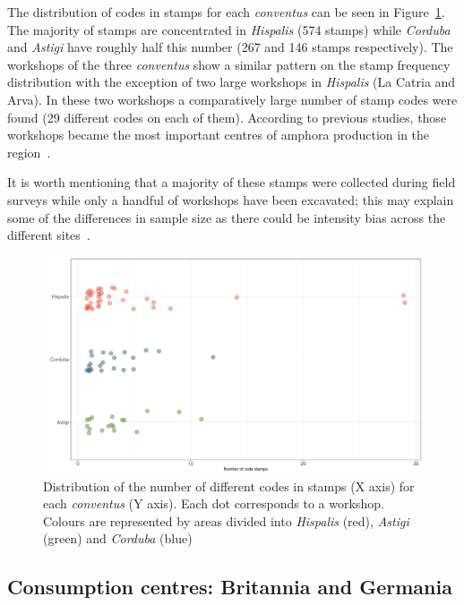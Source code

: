 The distribution of codes in stamps for each \textit{conventus} can be seen in Figure~\ref{frequency}. The majority of stamps are concentrated in \textit{Hispalis} (574 stamps) while \textit{Corduba} and \textit{Astigi} have roughly half this number (267 and 146 stamps respectively). The workshops of the three \textit{conventus} show a similar pattern on the stamp frequency distribution with the exception of two large workshops in \textit{Hispalis} (La Catria and Arva). In these two workshops a comparatively large number of stamp codes were found (29 different codes on each of them). According to previous studies, those workshops became the most important centres of amphora production in the region~\citep{rodriguez_economioleicola_1977,arva_1997}.

It is worth mentioning that a majority of these stamps were collected during field surveys while only a handful of workshops have been excavated; this may explain some of the differences in sample size as there could be intensity bias across the different sites~\citep{arva_1997}.
 
\begin{figure}[htp]
	\centering
\includegraphics[width=\linewidth]{frequency}
\caption{Distribution of the number of different codes in stamps (X axis) for each \textit{conventus} (Y axis). Each dot corresponds to a workshop. Colours are represented by areas divided into \textit{Hispalis} (red), \textit{Astigi} (green) and \textit{Corduba} (blue)}
\label{frequency}
\end{figure} 


\subsection{Consumption centres: Britannia and Germania}
\label{sec:5}

